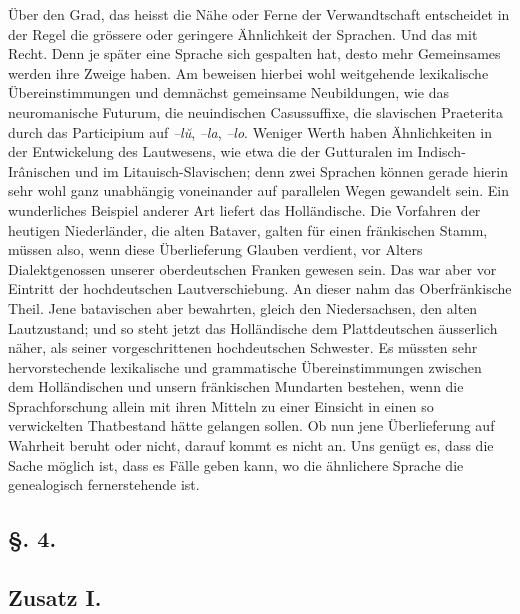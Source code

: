 Über den Grad, das heisst die Nähe oder Ferne der Verwandtschaft entscheidet in der Regel die grössere oder geringere Ähnlichkeit der Sprachen. Und das mit Recht. Denn je später eine Sprache sich gespalten hat, desto mehr Gemeinsames werden ihre Zweige haben. Am  beweisen hierbei wohl weitgehende lexikalische Übereinstimmungen und demnächst gemeinsame Neubildungen, wie das neuromanische Futurum, die neuindischen Casussuffixe, die slavischen Praeterita durch das Participium auf \textit{–lŭ}, \textit{–la}, \textit{–lo}. Weniger Werth haben Ähnlichkeiten in der Entwickelung des Lautwesens, wie etwa die der Gutturalen im Indisch-Irânischen und im Litauisch-Slavischen; denn zwei Sprachen können gerade hierin sehr wohl ganz unabhängig voneinander auf parallelen \label{fp.170} Wegen gewandelt sein. Ein wunderliches Beispiel anderer Art liefert das Holländische. Die Vorfahren der heutigen  Niederländer, die alten Bataver, galten für einen fränkischen Stamm, müssen also, wenn diese Überlieferung Glauben verdient, vor Alters Dialektgenossen unserer oberdeutschen Franken gewesen sein. Das war aber vor Eintritt der hochdeutschen Lautverschiebung. An dieser nahm das Oberfränkische Theil. Jene batavischen  aber bewahrten, gleich den Niedersachsen, den alten Lautzustand; und so steht jetzt das Holländische dem Plattdeutschen äusserlich näher, als seiner vorgeschrittenen hochdeutschen Schwester. Es müssten sehr hervorstechende lexikalische und grammatische Übereinstimmungen zwischen dem Holländischen und unsern fränkischen Mundarten bestehen, wenn die Sprachforschung allein mit ihren Mitteln zu einer Einsicht in einen so verwickelten Thatbestand hätte \label{sp.160} gelangen sollen. Ob nun jene Überlieferung auf Wahrheit beruht oder nicht, darauf kommt es nicht an. Uns genügt es, dass die Sache möglich ist, dass es Fälle geben kann, wo die ähnlichere Sprache die genealogisch fernerstehende ist.

\subsection*{§. 4.}\label{III.I.I.4}
\subsection*{Zusatz I.}
